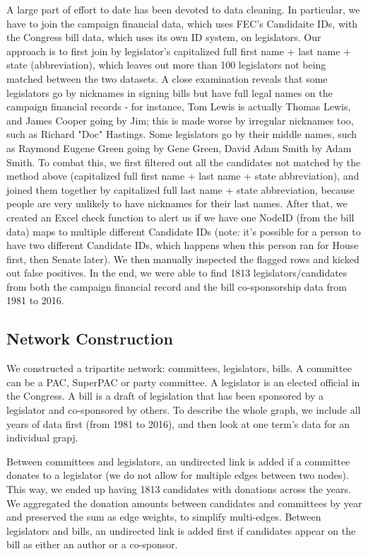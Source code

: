 \documentclass[12pt,twocolumn]{article}
\begin{document}
A large part of effort to date has been devoted to data cleaning. In particular, we have to join the campaign financial data, which uses FEC's Candidaite IDs, with the Congress bill data, which uses its own ID system, on legislators. Our approach is to first join by legislator's capitalized full first name + last name + state (abbreviation), which leaves out more than 100 legislators not being matched between the two datasets. A close examination reveals that some legislators go by nicknames in signing bills but have full legal names on the campaign financial records - for instance, Tom Lewis is actually Thomas Lewis, and James Cooper going by Jim; this is made worse by irregular nicknames too, such as Richard "Doc" Hastings. Some legislators go by their middle names, such as Raymond Eugene Green going by Gene Green, David Adam Smith by Adam Smith. To combat this, we first filtered out all the candidates not matched by the method above (capitalized full first name + last name + state abbreviation), and joined them together by capitalized full last name + state abbreviation, because people are very unlikely to have nicknames for their last names. After that, we created an Excel check function to alert us if we have one NodeID (from the bill data) maps to multiple different Candidate IDs (note: it's possible for a person to have two different Candidate IDs, which happens when this person ran for House first, then Senate later). We then manually inspected the flagged rows and kicked out false positives. In the end, we were able to find 1813 legislators/candidates from both the campaign financial record and the bill co-sponsorship data from 1981 to 2016. 

\subsection{Network Construction}
We constructed a tripartite network: committees, legislators, bills.  A committee can be a PAC, SuperPAC or party committee.  A legislator is an elected official in the Congress. A bill is a draft of legislation that has been sponsored by a legislator and co-sponsored by others. To describe the whole graph, we include all years of data first (from 1981 to 2016), and then look at one term's data for an individual grapj. 

Between committees and legislators, an undirected link is added if a committee donates to a legislator (we do not allow for multiple edges between two nodes). This way, we ended up having 1813 candidates with donations across the years. We aggregated the donation amounts between candidates and committees by year and preserved the sum as edge weights, to simplify multi-edges.  Between legislators and bills, an undirected link is added first if candidates appear on the bill as either an author or a co-sponsor. 
\end{document}
